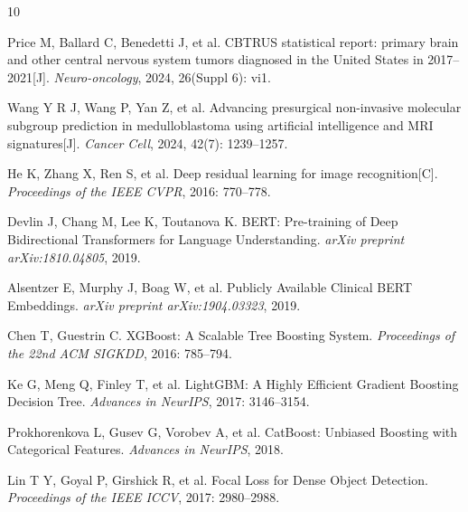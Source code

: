 \documentclass[11pt,a4paper]{article}
\begin{document}









\begin{thebibliography}{10}

Price M, Ballard C, Benedetti J, et al.
CBTRUS statistical report: primary brain and other central nervous system tumors diagnosed in the United States in 2017--2021[J].
\textit{Neuro-oncology}, 2024, 26(Suppl 6): vi1.

Wang Y R J, Wang P, Yan Z, et al.
Advancing presurgical non-invasive molecular subgroup prediction in medulloblastoma using artificial intelligence and MRI signatures[J].
\textit{Cancer Cell}, 2024, 42(7): 1239--1257.

He K, Zhang X, Ren S, et al.
Deep residual learning for image recognition[C].
\textit{Proceedings of the IEEE CVPR}, 2016: 770--778.

Devlin J, Chang M, Lee K, Toutanova K.
BERT: Pre-training of Deep Bidirectional Transformers for Language Understanding.
\textit{arXiv preprint arXiv:1810.04805}, 2019.

Alsentzer E, Murphy J, Boag W, et al.
Publicly Available Clinical BERT Embeddings.
\textit{arXiv preprint arXiv:1904.03323}, 2019.

Chen T, Guestrin C.
XGBoost: A Scalable Tree Boosting System.
\textit{Proceedings of the 22nd ACM SIGKDD}, 2016: 785--794.

Ke G, Meng Q, Finley T, et al.
LightGBM: A Highly Efficient Gradient Boosting Decision Tree.
\textit{Advances in NeurIPS}, 2017: 3146--3154.

Prokhorenkova L, Gusev G, Vorobev A, et al.
CatBoost: Unbiased Boosting with Categorical Features.
\textit{Advances in NeurIPS}, 2018.

Lin T Y, Goyal P, Girshick R, et al.
Focal Loss for Dense Object Detection.
\textit{Proceedings of the IEEE ICCV}, 2017: 2980--2988.

\end{thebibliography}
\end{document}
